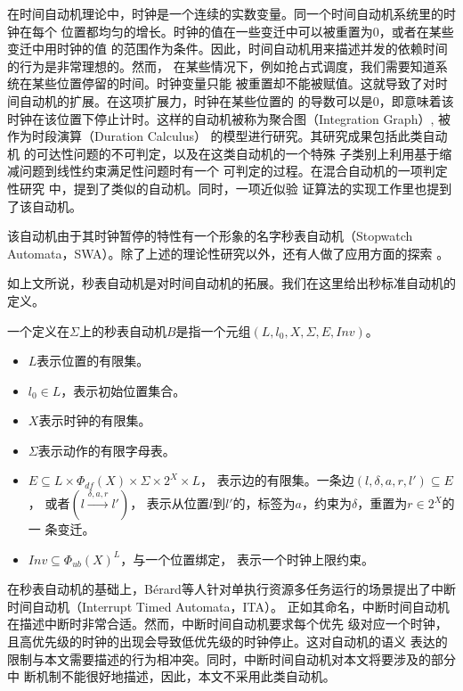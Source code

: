 在时间自动机理论中，时钟是一个连续的实数变量。同一个时间自动机系统里的时钟在每个
位置都均匀的增长。时钟的值在一些变迁中可以被重置为0，或者在某些变迁中用时钟的值
的范围作为条件。因此，时间自动机用来描述并发的依赖时间的行为是非常理想的。然而，
在某些情况下，例如抢占式调度，我们需要知道系统在某些位置停留的时间。时钟变量只能
被重置却不能被赋值。这就导致了对时间自动机的扩展。在这项扩展力，时钟在某些位置的
的导数可以是0，即意味着该时钟在该位置下停止计时。这样的自动机被称为聚合图（Integration
Graph）\cite{Kesten:1999:DIG:302392.302397}, 被作为时段演算（Duration Calculus）
\cite{DBLP:journals/ipl/ChaochenHR91}的模型进行研究。其研究成果包括此类自动机
的可达性问题的不可判定\cite{Alur04decisionproblems}，以及在这类自动机的一个特殊
子类别上利用基于缩减问题到线性约束满足性问题\cite{Apt:2003:PCP:1237975}时有一个
可判定的过程。在混合自动机\cite{Henzinger96thetheory}的一项判定性研究
\cite{McManis:1994:SAD:647763.735660}中，提到了类似的自动机。同时，一项近似验
证算法的实现工作\cite{Cassez:2000:IPS:646735.701625}里也提到了该自动机。

该自动机由于其时钟暂停的特性有一个形象的名字\pozhehao 秒表自动机（Stopwatch
Automata，SWA）。除了上述的理论性研究以外，还有人做了应用方面的探索
\cite{Abdeddaim:2002:PJS:646486.694487}。

如上文所说，秒表自动机是对时间自动机的拓展。我们在这里给出秒标准自动机的定义。

\begin{definition}
	\label{def:SWA}
	一个定义在$\varSigma$上的秒表自动机$B$是指一个元组$(L,l_0,X,\varSigma,E,Inv)$。
	\begin{itemize}
		\item $L$表示位置的有限集。
		\item $l_0\in L$，表示初始位置集合。
		\item $X$表示时钟的有限集。
		\item $\varSigma$表示动作的有限字母表。
		\item $E\subseteq L\times \varPhi_{df}(X)\times \varSigma \times 2^X\times L$，
		表示边的有限集。一条边$(l,\delta,a,r,l')\subseteq E$，
		或者$(l\stackrel{\delta,a,r}{\longrightarrow}l')$，
		表示从位置$l$到$l'$的，标签为$a$，约束为$\delta$，重置为$r\in 2^X$的一
		条变迁。
		\item $Inv\subseteq \varPhi_{ub}(X)^L$，与一个位置绑定，
		表示一个时钟上限约束。
	\end{itemize}
\end{definition}

在秒表自动机的基础上，B{\'e}rard等人针对单执行资源多任务运行的场景提出了中断
时间自动机（Interrupt Timed Automata，ITA）。\cite{Berard:2012:ITA:2158996.2159045}
正如其命名，中断时间自动机在描述中断时非常合适。然而，中断时间自动机要求每个优先
级对应一个时钟，且高优先级的时钟的出现会导致低优先级的时钟停止。这对自动机的语义
表达的限制与本文需要描述的行为相冲突。同时，中断时间自动机对本文将要涉及的部分中
断机制不能很好地描述，因此，本文不采用此类自动机。

